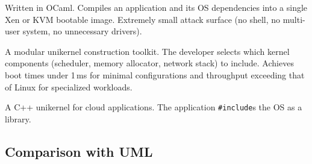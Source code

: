 \begin{description}[style=nextline,leftmargin=2em]
  \item[MirageOS~\cite{madhavapeddy2013}.]
    Written in OCaml.  Compiles an application and its OS dependencies
    into a single Xen or KVM bootable image.  Extremely small attack
    surface (no shell, no multi-user system, no unnecessary drivers).

  \item[Unikraft~\cite{kuenzer2021}.]
    A modular unikernel construction toolkit.  The developer selects
    which kernel components (scheduler, memory allocator, network
    stack) to include.  Achieves boot times under 1\,ms for minimal
    configurations and throughput exceeding that of Linux for
    specialized workloads.

  \item[IncludeOS.]
    A C++ unikernel for cloud applications.  The application
    \texttt{\#include}s the OS as a library.
\end{description}

\subsection{Comparison with UML}

